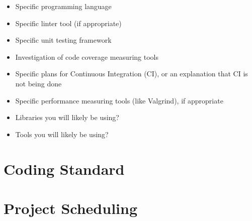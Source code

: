 \documentclass{article}
\begin{document}
\begin{itemize}
	\item Specific programming language
	\item Specific linter tool (if appropriate)
	\item Specific unit testing framework
	\item Investigation of code coverage measuring tools
	\item Specific plans for Continuous Integration (CI), or an explanation that CI
	is not being done
	\item Specific performance measuring tools (like Valgrind), if
	appropriate
	\item Libraries you will likely be using?
	\item Tools you will likely be using?
\end{itemize}

\section{Coding Standard}

\section{Project Scheduling}

\end{document}
